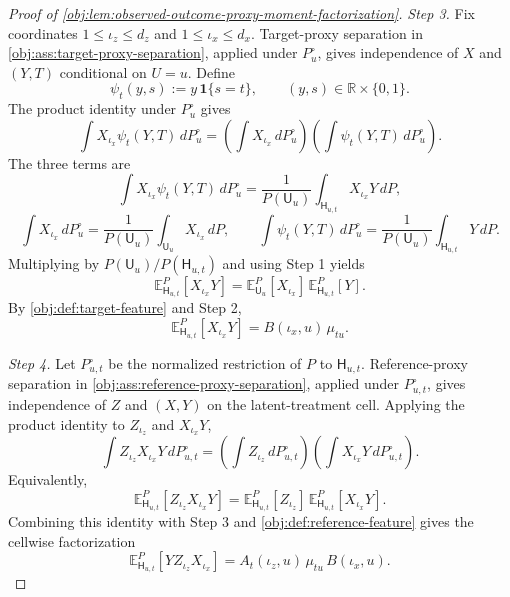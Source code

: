 \documentclass[11pt]{article}
\begin{document}
\begin{proof}[Proof of \cref{obj:lem:observed-outcome-proxy-moment-factorization}]
\emph{Step 3.} Fix coordinates \(1\le \iota_z\le d_z\) and \(1\le \iota_x\le d_x\).  Target-proxy separation in \cref{obj:ass:target-proxy-separation}, applied under \(P_u^\circ\), gives independence of \(X\) and \((Y,T)\) conditional on \(U=u\).  Define
\[
\psi_t(y,s):=y\,\mathbf 1\{s=t\},
\qquad (y,s)\in\mathbb R\times\{0,1\}.
\]
The product identity under \(P_u^\circ\) gives
\[
\int X_{\iota_x}\psi_t(Y,T)\,dP_u^\circ
=
\left(\int X_{\iota_x}\,dP_u^\circ\right)
\left(\int \psi_t(Y,T)\,dP_u^\circ\right).
\]
The three terms are
\[
\int X_{\iota_x}\psi_t(Y,T)\,dP_u^\circ
=
\frac{1}{P(\mathsf U_u)}
\int_{\mathsf H_{u,t}}X_{\iota_x}Y\,dP,
\]
\[
\int X_{\iota_x}\,dP_u^\circ
=
\frac{1}{P(\mathsf U_u)}
\int_{\mathsf U_u}X_{\iota_x}\,dP,
\qquad
\int \psi_t(Y,T)\,dP_u^\circ
=
\frac{1}{P(\mathsf U_u)}
\int_{\mathsf H_{u,t}}Y\,dP .
\]
Multiplying by \(P(\mathsf U_u)/P(\mathsf H_{u,t})\) and using Step 1 yields
\[
\mathbb E_{\mathsf H_{u,t}}^{P}[X_{\iota_x}Y]
=
\mathbb E_{\mathsf U_u}^{P}[X_{\iota_x}]\,
\mathbb E_{\mathsf H_{u,t}}^{P}[Y].
\]
By \cref{obj:def:target-feature} and Step 2,
\[
\mathbb E_{\mathsf H_{u,t}}^{P}[X_{\iota_x}Y]
=
B(\iota_x,u)\,\mu_{tu}.
\]

\emph{Step 4.} Let \(P_{u,t}^\circ\) be the normalized restriction of \(P\) to \(\mathsf H_{u,t}\).  Reference-proxy separation in \cref{obj:ass:reference-proxy-separation}, applied under \(P_{u,t}^\circ\), gives independence of \(Z\) and \((X,Y)\) on the latent-treatment cell.  Applying the product identity to \(Z_{\iota_z}\) and \(X_{\iota_x}Y\),
\[
\int Z_{\iota_z}X_{\iota_x}Y\,dP_{u,t}^\circ
=
\left(\int Z_{\iota_z}\,dP_{u,t}^\circ\right)
\left(\int X_{\iota_x}Y\,dP_{u,t}^\circ\right).
\]
Equivalently,
\[
\mathbb E_{\mathsf H_{u,t}}^{P}[Z_{\iota_z}X_{\iota_x}Y]
=
\mathbb E_{\mathsf H_{u,t}}^{P}[Z_{\iota_z}]\,
\mathbb E_{\mathsf H_{u,t}}^{P}[X_{\iota_x}Y].
\]
Combining this identity with Step 3 and \cref{obj:def:reference-feature} gives the cellwise factorization
\[
\mathbb E_{\mathsf H_{u,t}}^{P}[YZ_{\iota_z}X_{\iota_x}]
=
A_t(\iota_z,u)\,\mu_{tu}\,B(\iota_x,u).
\]


\end{proof}
\end{document}
